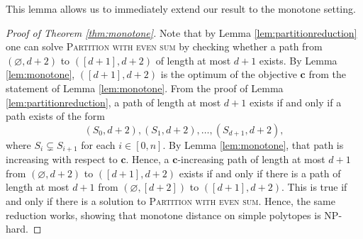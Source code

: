 \documentclass[centering,11pt,reqno]{amsart}
\newtheorem{lem}[theorem]{Lemma}
\theoremstyle{definition}
\renewcommand{\emptyset}{\varnothing}
\newcommand{\NP}{\textsc{NP}}
\begin{document}
This lemma allows us to immediately extend our result to the monotone setting.

\begin{proof}[Proof of Theorem \ref{thm:monotone}]
Note that by Lemma \ref{lem:partitionreduction} one can solve \textsc{Partition with even sum} by checking whether a path from $(\emptyset, d+2)$ to $([d+1],d+2)$ of length at most $d+1$ exists. By Lemma \ref{lem:monotone}, $([d+1],d+2)$ is the optimum of the objective $\mathbf{c}$ from the statement of Lemma \ref{lem:monotone}. From the proof of Lemma \ref{lem:partitionreduction}, a path of length at most $d+1$ exists if and only if a path exists of the form \[(S_{0}, d+2), (S_{1},d+2),\dots,(S_{d+1}, d+2),\]
where $S_{i} \subsetneq S_{i+1}$ for each $i \in [0,n]$. By Lemma \ref{lem:monotone}, that path is increasing with respect to $\mathbf{c}$. Hence, a $\mathbf{c}$-increasing path of length at most $d+1$ from $(\emptyset,d+2)$ to $([d+1],d+2)$ exists if and only if there is a path of length at most $d+1$ from $(\emptyset,[d+2])$ to $([d+1],d+2)$. This is true if and only if there is a solution to \textsc{Partition with even sum}. Hence, the same reduction works, showing that monotone distance on simple polytopes is \NP-hard. 
\end{proof}

\end{document}
